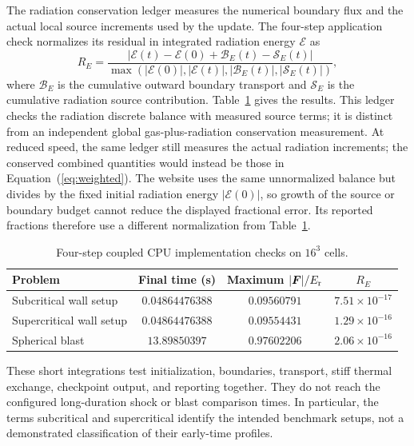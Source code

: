 \documentclass[manuscript]{aastex7}
\newcommand{\vct}[1]{\boldsymbol{#1}}
\newcommand{\Er}{E_{\rm r}}
\newcommand{\Fr}{\vct{F}}
\begin{document}
The radiation conservation ledger measures the numerical boundary flux
and the actual local source increments used by the update. The four-step
application check normalizes its residual in integrated radiation energy
$\mathcal{E}$ as
\begin{equation}
 R_E=\frac{|\mathcal{E}(t)-\mathcal{E}(0)
                 +\mathcal{B}_E(t)-\mathcal{S}_E(t)|}
 {\max(|\mathcal{E}(0)|,|\mathcal{E}(t)|,
                 |\mathcal{B}_E(t)|,|\mathcal{S}_E(t)|)},
 \label{eq:ledger}
\end{equation}
where $\mathcal{B}_E$ is the cumulative outward boundary transport and
$\mathcal{S}_E$ is the cumulative radiation source contribution.
Table~\ref{tab:smoke} gives the results. This ledger checks the radiation
discrete balance with measured source terms; it is distinct from an
independent global gas-plus-radiation conservation measurement.
At reduced speed, the same ledger still measures the actual radiation
increments; the conserved combined quantities would instead be those
in Equation~(\ref{eq:weighted}).
The website uses the same unnormalized balance but divides by the fixed
initial radiation energy $|\mathcal{E}(0)|$, so growth of the source or
boundary budget cannot reduce the displayed fractional error. Its
reported fractions therefore use a different normalization from
Table~\ref{tab:smoke}.

\begin{table}[ht]
\centering
\caption{Four-step coupled CPU implementation checks on $16^3$ cells.
\label{tab:smoke}}
\begin{tabular}{lccc}
\hline
Problem & Final time (s) & Maximum $|\Fr|/\Er$ & $R_E$ \\
\hline
Subcritical wall setup & $0.04864476388$ & $0.09560791$ & $7.51\times10^{-17}$ \\
Supercritical wall setup & $0.04864476388$ & $0.09554431$ & $1.29\times10^{-16}$ \\
Spherical blast & $13.89850397$ & $0.97602206$ & $2.06\times10^{-16}$ \\
\hline
\end{tabular}
\end{table}

These short integrations test initialization, boundaries, transport,
stiff thermal exchange, checkpoint output, and reporting together.
They do not reach the configured long-duration shock or blast comparison
times. In particular, the terms subcritical and supercritical identify
the intended benchmark setups, not a demonstrated classification of
their early-time profiles.
\end{document}
